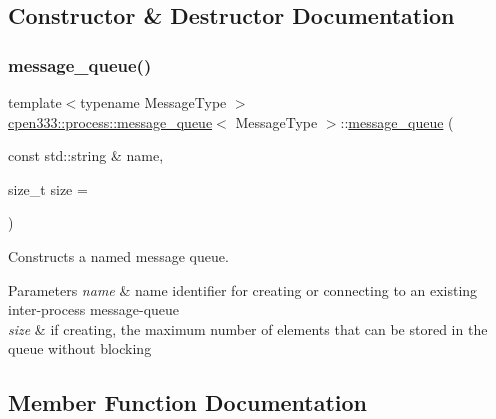 \subsection{Constructor \& Destructor Documentation}
\mbox{\label{classcpen333_1_1process_1_1message__queue_a3312decb9ec69e323ba97f321125d348}} 
\subsubsection{\texorpdfstring{message\+\_\+queue()}{message\_queue()}}
{\footnotesize\ttfamily template$<$typename Message\+Type $>$ \\
\hyperlink{classcpen333_1_1process_1_1message__queue}{cpen333\+::process\+::message\+\_\+queue}$<$ Message\+Type $>$\+::\hyperlink{classcpen333_1_1process_1_1message__queue}{message\+\_\+queue} (\begin{DoxyParamCaption}\item[{const std\+::string \&}]{name,  }\item[{size\+\_\+t}]{size = {} }\end{DoxyParamCaption})\hspace{0.3cm}{\ttfamily [inline]}}



Constructs a named message queue. 


\begin{DoxyParams}{Parameters}
{\em name} & name identifier for creating or connecting to an existing inter-\/process message-\/queue \\
\hline
{\em size} & if creating, the maximum number of elements that can be stored in the queue without blocking \\
\hline
\end{DoxyParams}


\subsection{Member Function Documentation}
\mbox{\label{classcpen333_1_1process_1_1message__queue_a321bee9b732f97362172c6c4ee8226a4}} 
